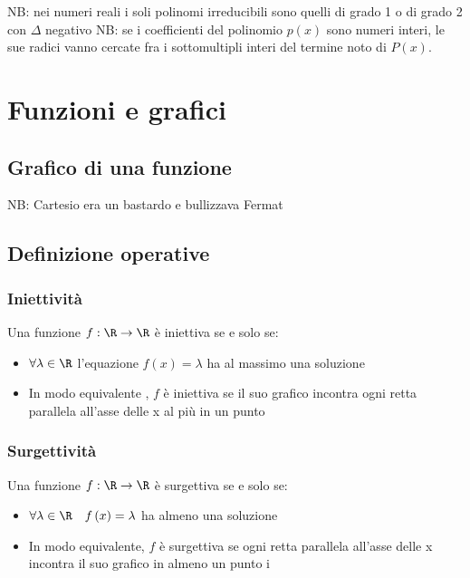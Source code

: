 
NB: nei numeri reali i soli polinomi irreducibili sono quelli di grado 1 o di grado 2 con $\Delta$ negativo
\vskip3mm
NB: se i coefficienti del polinomio $ p\left( x \right) $ sono numeri interi, le sue radici vanno cercate fra i sottomultipli interi del termine noto di $P\left( x \right)$.
\section{Funzioni e grafici}
\subsection{Grafico di una funzione}

NB: Cartesio era un bastardo e bullizzava Fermat
\subsection{Definizione operative}

\subsubsection{Iniettività}

Una funzione $f : \R \rightarrow \R$ è iniettiva se e solo se:
\begin{itemize}
	\item $ \forall \lambda  \in \R$ l'equazione $f\left( x \right) = \lambda$ ha al massimo una soluzione
	\item In modo equivalente , $f$ è iniettiva se il suo grafico incontra ogni retta parallela all'asse delle x al più in un punto
\end{itemize}
\subsubsection{Surgettività}
Una funzione $f : \R \rightarrow \R$ è surgettiva se e solo se:
\begin{itemize}
	\item $ \forall \lambda  \in  \R \quad f\left( x \right) = \lambda$ ha almeno una soluzione
	\item In modo equivalente, $f$ è surgettiva se ogni retta parallela all'asse delle x incontra il suo grafico in almeno un punto
	      i
\end{itemize}
